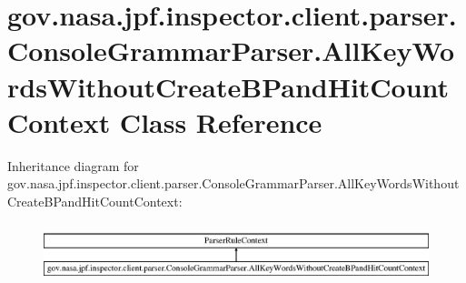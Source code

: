 \hypertarget{classgov_1_1nasa_1_1jpf_1_1inspector_1_1client_1_1parser_1_1_console_grammar_parser_1_1_all_key_5423188b2439879f44801649cdee10f6}{}\section{gov.\+nasa.\+jpf.\+inspector.\+client.\+parser.\+Console\+Grammar\+Parser.\+All\+Key\+Words\+Without\+Create\+B\+Pand\+Hit\+Count\+Context Class Reference}
\label{classgov_1_1nasa_1_1jpf_1_1inspector_1_1client_1_1parser_1_1_console_grammar_parser_1_1_all_key_5423188b2439879f44801649cdee10f6}
Inheritance diagram for gov.\+nasa.\+jpf.\+inspector.\+client.\+parser.\+Console\+Grammar\+Parser.\+All\+Key\+Words\+Without\+Create\+B\+Pand\+Hit\+Count\+Context\+:\begin{figure}[H]
\begin{center}
\leavevmode
\includegraphics[height=1.741835cm]{classgov_1_1nasa_1_1jpf_1_1inspector_1_1client_1_1parser_1_1_console_grammar_parser_1_1_all_key_5423188b2439879f44801649cdee10f6}
\end{center}
\end{figure}
